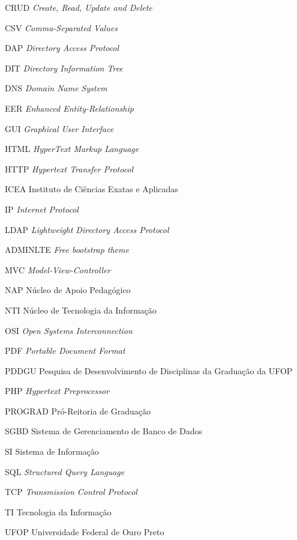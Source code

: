 \documentclass[
  12pt,       %
  openright,      %
  oneside,      %
  a4paper,      %
  english,      %
  french,        %
  spanish,     %
  brazil        %
  ]{abntex2-decsi}
\begin{document}
\listoffigures*
\cleardoublepage

\listoftables*
\cleardoublepage

\begin{siglas}
  \item[CRUD] \textit{Create, Read, Update and Delete}
  \item[CSV] \textit{Comma-Separated Values}
  \item[DAP] \textit{Directory Access Protocol}
  \item[DIT] \textit{Directory Information Tree}
  \item[DNS] \textit{Domain Name System}
  \item[EER] \textit{Enhanced Entity-Relationship}
  \item[GUI] \textit{Graphical User Interface}
  \item[HTML] \textit{HyperText Markup Language}
  \item[HTTP] \textit{Hypertext Transfer Protocol}
  \item[ICEA] Instituto de Ciências Exatas e Aplicadas
  \item[IP] \textit{Internet Protocol}
  \item[LDAP] \textit{Lightweight Directory Access Protocol}
  \item[ADMINLTE] \textit{Free bootstrap theme}
  \item[MVC] \textit{Model-View-Controller}
  \item[NAP] Núcleo de Apoio Pedagógico
  \item[NTI] Núcleo de Tecnologia da Informação
  \item[OSI] \textit{Open Systems Interconnection}
  \item[PDF] \textit{Portable Document Format}
  \item[PDDGU] Pesquisa de Desenvolvimento de Disciplinas da Graduação da UFOP
  \item[PHP] \textit{Hypertext Preprocessor}
  \item[PROGRAD] Pró-Reitoria de Graduação
  \item[SGBD] Sistema de Gerenciamento de Banco de Dados
  \item[SI] Sistema de Informação
  \item[SQL] \textit{Structured Query Language}
  \item[TCP] \textit{Transmission Control Protocol}
  \item[TI] Tecnologia da Informação
  \item[UFOP] Universidade Federal de Ouro Preto
\end{siglas}
\end{document}
